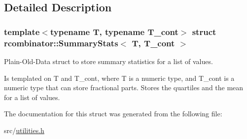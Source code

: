 \subsection{Detailed Description}
\subsubsection*{template$<$typename T, typename T\+\_\+cont$>$\newline
struct rcombinator\+::\+Summary\+Stats$<$ T, T\+\_\+cont $>$}

Plain-\/\+Old-\/\+Data struct to store summary statistics for a list of values. 

Is templated on T and T\+\_\+cont, where T is a numeric type, and T\+\_\+cont is a numeric type that can store fractional parts. Stores the quartiles and the mean for a list of values. 

The documentation for this struct was generated from the following file\+:\begin{DoxyCompactItemize}
\item 
src/\mbox{\hyperlink{utilities_8h}{utilities.\+h}}\end{DoxyCompactItemize}

